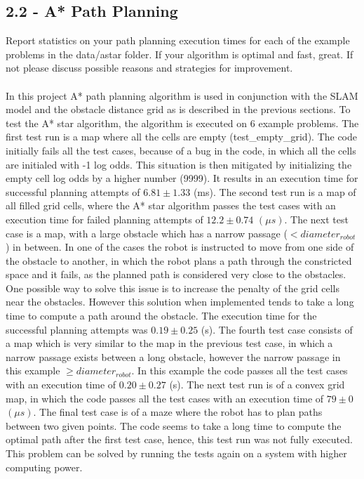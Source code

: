 \documentclass[journal,onecolumn]{IEEEtran}
\begin{document}
\subsection*{2.2 - A* Path Planning} 

Report statistics on your path planning execution times for each of the example problems in the data/astar folder. If your algorithm is optimal and fast, great. If not please discuss possible reasons and strategies for improvement.
\\
\\
In this project A* path planning algorithm is used in conjunction with the SLAM model and the obstacle distance grid as is described in the previous sections. To test the A* star algorithm, the algorithm is executed on 6 example problems. The first test run is a map where all the cells are empty (test\_empty\_grid). The code initially fails all the test cases, because of a bug in the code, in which all the cells are initialed with -1 log odds. This situation is then mitigated by initializing the empty cell log odds by a higher number (9999). It results in an execution time for successful planning attempts of $6.81\pm1.33$ (ms). The second test run is a map of all filled grid cells, where the A* star algorithm passes the test cases with an execution time for failed planning attempts of $12.2\pm0.74$ $(\mu s)$. The next test case is a map, with a large obstacle which has a narrow passage ($<diameter_{robot}$) in between. In one of the cases the robot is instructed to move from one side of the obstacle to another, in which the robot plans a path through the constricted space and it fails, as the planned path is considered very close to the obstacles. One possible way to solve this issue is to increase the penalty of the grid cells near the obstacles. However this solution when implemented tends to take a long time to compute a path around the obstacle. The execution time for the successful planning attempts was $0.19\pm0.25$ (s). The fourth test case consists of a map which is very similar to the map in the previous test case, in which a narrow passage exists between a long obstacle, however the narrow passage in this example $\geq diameter_{robot}$. In this example the code passes all the test cases with an execution time of $0.20\pm0.27$ (s). The next test run is of a convex grid map, in which the code passes all the test cases with an execution time of $79\pm0$ $(\mu s)$. The final test case is of a maze where the robot has to plan paths between two given points. The code seems to take a long time to compute the optimal path after the first test case, hence, this test run was not fully executed. This problem can be solved by running the tests again on a system with higher computing power. 
\end{document}
